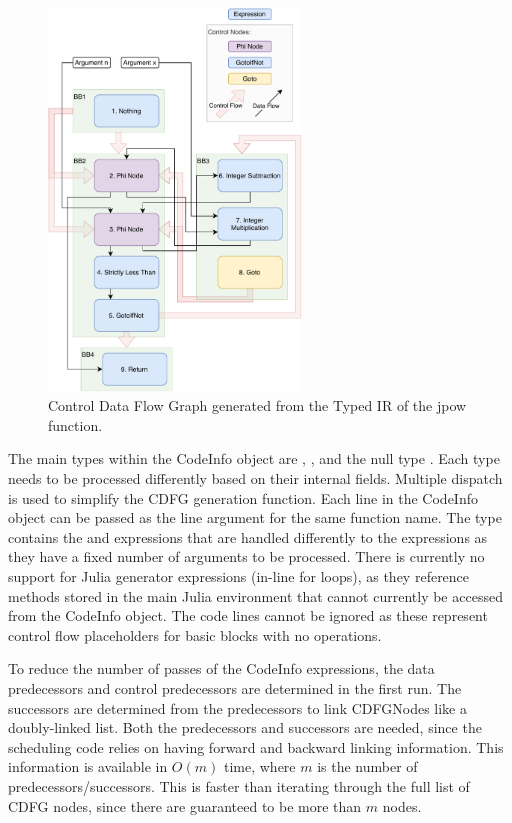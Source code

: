 \pagebreak

\begin{figure}[htb!]
    \centering
    \includegraphics[width=0.6\textwidth]{Images/CDFG.pdf}
    \caption{Control Data Flow Graph generated from the Typed IR of the jpow function.}
    \label{fig:cdfg_pow}
\end{figure}

The main types within the CodeInfo object are , ,  and the null type . Each type needs to be processed differently based on their internal fields. Multiple dispatch is used to simplify the CDFG generation function. Each line in the CodeInfo object can be passed as the line argument for the same function name. The  type contains the  and  expressions that are handled differently to the expressions as they have a fixed number of arguments to be processed. There is currently no support for Julia  generator expressions (in-line for loops), as they reference methods stored in the main Julia environment that cannot currently be accessed from the CodeInfo object. The  code lines cannot be ignored as these represent control flow placeholders for basic blocks with no operations. 

To reduce the number of passes of the CodeInfo expressions, the data predecessors and control predecessors are determined in the first run. The successors are determined from the predecessors to link CDFGNodes like a doubly-linked list. Both the predecessors and successors are needed, since the scheduling code relies on having forward and backward linking information. This information is available in $O(m)$ time, where $m$ is the number of predecessors/successors. This is faster than iterating through the full list of CDFG nodes, since there are  guaranteed to be more than $m$ nodes.

